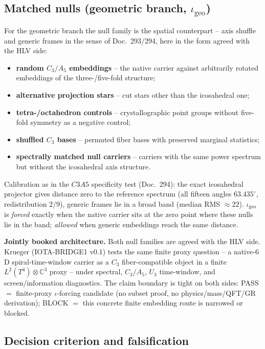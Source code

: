 \subsection*{Matched nulls (geometric branch, $\iota_{\text{geo}}$)}

For the geometric branch the null family is the spatial counterpart --
axis shuffle and generic frames in the sense of Doc.~293/294, here in the
form agreed with the HLV side:
\begin{itemize}
  \item \textbf{random $C_3/A_5$ embeddings} -- the native carrier against
    arbitrarily rotated embeddings of the three-/five-fold structure;
  \item \textbf{alternative projection stars} -- cut stars other than the
    icosahedral one;
  \item \textbf{tetra-/octahedron controls} -- crystallographic point
    groups without five-fold symmetry as a negative control;
  \item \textbf{shuffled $C_3$ bases} -- permuted fiber bases with
    preserved marginal statistics;
  \item \textbf{spectrally matched null carriers} -- carriers with the same
    power spectrum but without the icosahedral axis structure.
\end{itemize}
Calibration as in the $C3A5$ specificity test (Doc.~294): the exact
icosahedral projector gives distance zero to the reference spectrum (all
fifteen angles $63{.}435^\circ$, redistribution $2/9$), generic frames lie
in a broad band (median RMS $\approx 22$). $\iota_{\text{geo}}$ is
\emph{forced} exactly when the native carrier sits at the zero point where
these nulls lie in the band; \emph{allowed} when generic embeddings reach the
same distance.

\medskip\noindent\textbf{Jointly booked architecture.} Both null families
are agreed with the HLV side. Krueger (IOTA-BRIDGE1 v0.1) tests the same
finite proxy question -- a native-$6$D spiral-time-window carrier as a $C_3$
fiber-compatible object in a finite $L^2(T^4)\otimes\mathbb{C}^3$ proxy --
under spectral, $C_3/A_5$, $U_3$ time-window, and screen/information
diagnostics. The claim boundary is tight on both sides: PASS $=$ finite-proxy
$\iota$-forcing candidate (no subset proof, no physics/mass/QFT/GR
derivation); BLOCK $=$ this concrete finite embedding route is narrowed or
blocked.

\subsection*{Decision criterion and falsification}

